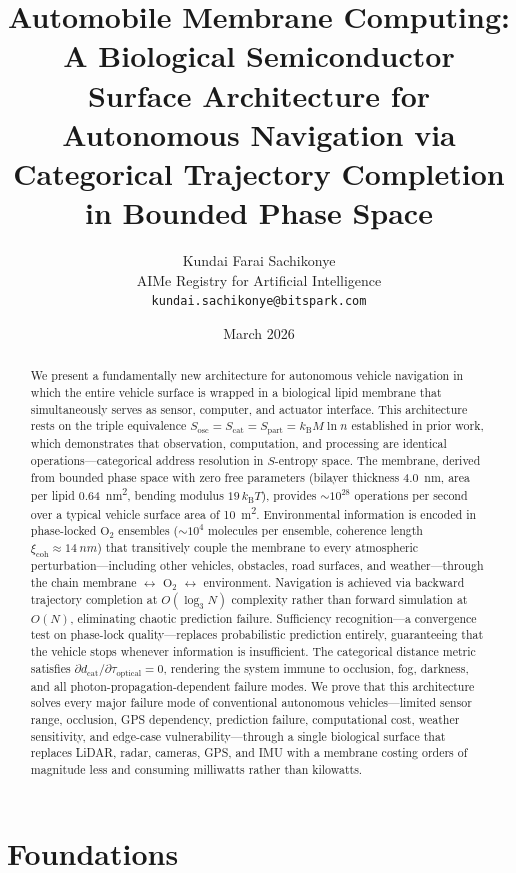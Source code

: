 \documentclass[twocolumn,10pt]{article}
\title{\textbf{Automobile Membrane Computing: A Biological Semiconductor Surface Architecture for Autonomous Navigation via Categorical Trajectory Completion in Bounded Phase Space}}
\author{
Kundai Farai Sachikonye\\
AIMe Registry for Artificial Intelligence\\
\texttt{kundai.sachikonye@bitspark.com}
}
\date{March 2026}
\theoremstyle{definition}
\theoremstyle{remark}
\newcommand{\Sosc}{S_{\mathrm{osc}}}
\newcommand{\Scat}{S_{\mathrm{cat}}}
\newcommand{\Spart}{S_{\mathrm{part}}}
\newcommand{\kB}{k_{\mathrm{B}}}
\newcommand{\dcat}{d_{\mathrm{cat}}}
\newcommand{\xicoh}{\xi_{\mathrm{coh}}}
\begin{document}
\maketitle

\begin{abstract}
We present a fundamentally new architecture for autonomous vehicle navigation in which the entire vehicle surface is wrapped in a biological lipid membrane that simultaneously serves as sensor, computer, and actuator interface. This architecture rests on the triple equivalence $\Sosc = \Scat = \Spart = \kB M \ln n$ established in prior work, which demonstrates that observation, computation, and processing are identical operations---categorical address resolution in $S$-entropy space. The membrane, derived from bounded phase space with zero free parameters (bilayer thickness \SI{4.0}{nm}, area per lipid \SI{0.64}{nm^2}, bending modulus $19\,\kB T$), provides $\sim 10^{28}$ operations per second over a typical vehicle surface area of \SI{10}{m^2}. Environmental information is encoded in phase-locked $\mathrm{O}_2$ ensembles ($\sim 10^4$ molecules per ensemble, coherence length $\xicoh \approx \SI{14}{nm}$) that transitively couple the membrane to every atmospheric perturbation---including other vehicles, obstacles, road surfaces, and weather---through the chain membrane $\leftrightarrow$ $\mathrm{O}_2$ $\leftrightarrow$ environment. Navigation is achieved via backward trajectory completion at $O(\log_3 N)$ complexity rather than forward simulation at $O(N)$, eliminating chaotic prediction failure. Sufficiency recognition---a convergence test on phase-lock quality---replaces probabilistic prediction entirely, guaranteeing that the vehicle stops whenever information is insufficient. The categorical distance metric satisfies $\partial \dcat / \partial \tau_{\mathrm{optical}} = 0$, rendering the system immune to occlusion, fog, darkness, and all photon-propagation-dependent failure modes. We prove that this architecture solves every major failure mode of conventional autonomous vehicles---limited sensor range, occlusion, GPS dependency, prediction failure, computational cost, weather sensitivity, and edge-case vulnerability---through a single biological surface that replaces LiDAR, radar, cameras, GPS, and IMU with a membrane costing orders of magnitude less and consuming milliwatts rather than kilowatts.
\end{abstract}

\part{Foundations}
\label{part:foundations}
\end{document}
